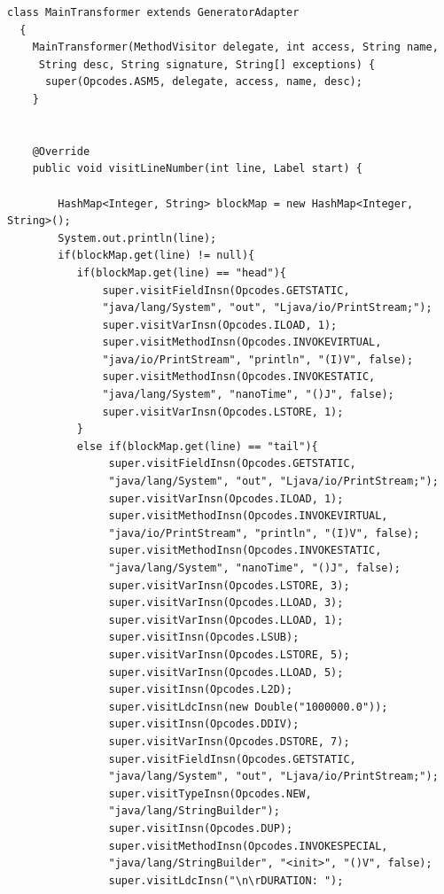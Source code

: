 \documentclass[11pt]{article}
\begin{document}
\begin{lstlisting}
class MainTransformer extends GeneratorAdapter
  {
    MainTransformer(MethodVisitor delegate, int access, String name, 
     String desc, String signature, String[] exceptions) {
      super(Opcodes.ASM5, delegate, access, name, desc);
    }


    @Override
    public void visitLineNumber(int line, Label start) {

        HashMap<Integer, String> blockMap = new HashMap<Integer, String>();
        System.out.println(line);
        if(blockMap.get(line) != null){
           if(blockMap.get(line) == "head"){
               super.visitFieldInsn(Opcodes.GETSTATIC, 
               "java/lang/System", "out", "Ljava/io/PrintStream;");
               super.visitVarInsn(Opcodes.ILOAD, 1);
               super.visitMethodInsn(Opcodes.INVOKEVIRTUAL, 
               "java/io/PrintStream", "println", "(I)V", false);
               super.visitMethodInsn(Opcodes.INVOKESTATIC, 
               "java/lang/System", "nanoTime", "()J", false);
               super.visitVarInsn(Opcodes.LSTORE, 1);
           }
           else if(blockMap.get(line) == "tail"){
                super.visitFieldInsn(Opcodes.GETSTATIC, 
                "java/lang/System", "out", "Ljava/io/PrintStream;");
                super.visitVarInsn(Opcodes.ILOAD, 1);
                super.visitMethodInsn(Opcodes.INVOKEVIRTUAL, 
                "java/io/PrintStream", "println", "(I)V", false);
                super.visitMethodInsn(Opcodes.INVOKESTATIC, 
                "java/lang/System", "nanoTime", "()J", false);
                super.visitVarInsn(Opcodes.LSTORE, 3);
                super.visitVarInsn(Opcodes.LLOAD, 3);
                super.visitVarInsn(Opcodes.LLOAD, 1);
                super.visitInsn(Opcodes.LSUB);
                super.visitVarInsn(Opcodes.LSTORE, 5);
                super.visitVarInsn(Opcodes.LLOAD, 5);
                super.visitInsn(Opcodes.L2D);
                super.visitLdcInsn(new Double("1000000.0"));
                super.visitInsn(Opcodes.DDIV);
                super.visitVarInsn(Opcodes.DSTORE, 7);
                super.visitFieldInsn(Opcodes.GETSTATIC, 
                "java/lang/System", "out", "Ljava/io/PrintStream;");
                super.visitTypeInsn(Opcodes.NEW, 
                "java/lang/StringBuilder");
                super.visitInsn(Opcodes.DUP);
                super.visitMethodInsn(Opcodes.INVOKESPECIAL, 
                "java/lang/StringBuilder", "<init>", "()V", false);
                super.visitLdcInsn("\n\rDURATION: ");

\end{lstlisting}
\end{document}
